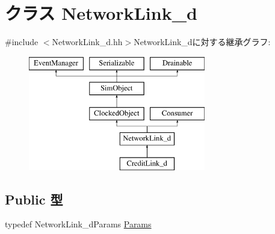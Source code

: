 \hypertarget{classNetworkLink__d}{
\section{クラス NetworkLink\_\-d}
\label{classNetworkLink__d}
}


{\ttfamily \#include $<$NetworkLink\_\-d.hh$>$}NetworkLink\_\-dに対する継承グラフ:\begin{figure}[H]
\begin{center}
\leavevmode
\includegraphics[height=5cm]{classNetworkLink__d}
\end{center}
\end{figure}
\subsection*{Public 型}
\begin{DoxyCompactItemize}
\item 
typedef NetworkLink\_\-dParams \hyperlink{classNetworkLink__d_a1384b11c71bbcc86aab6a3a201f7a51e}{Params}
\end{DoxyCompactItemize}
